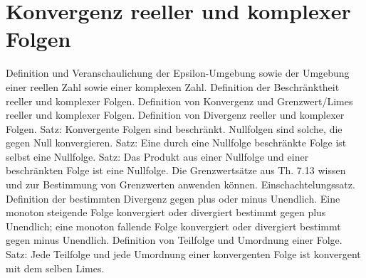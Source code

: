 \section{Konvergenz reeller und komplexer Folgen}
 
Definition und Veranschaulichung der Epsilon-Umgebung sowie der Umgebung einer reellen Zahl sowie einer komplexen Zahl. Definition der Beschränktheit reeller und komplexer Folgen. Definition von Konvergenz und Grenzwert/Limes reeller und komplexer Folgen. Definition von Divergenz reeller und komplexer Folgen. Satz: Konvergente Folgen sind beschränkt. Nullfolgen sind solche, die gegen Null konvergieren. Satz: Eine durch eine Nullfolge beschränkte Folge ist selbst eine Nullfolge. Satz: Das Produkt aus einer Nullfolge und einer beschränkten Folge ist eine Nullfolge. Die Grenzwertsätze aus Th. 7.13 wissen und zur Bestimmung von Grenzwerten anwenden können. Einschachtelungssatz. Definition der bestimmten Divergenz gegen plus oder minus Unendlich. Eine monoton steigende Folge konvergiert oder divergiert bestimmt gegen plus Unendlich; eine monoton fallende Folge konvergiert oder divergiert bestimmt gegen minus Unendlich. Definition von Teilfolge und Umordnung einer Folge. Satz: Jede Teilfolge und jede Umordnung einer konvergenten Folge ist konvergent mit dem selben Limes. 